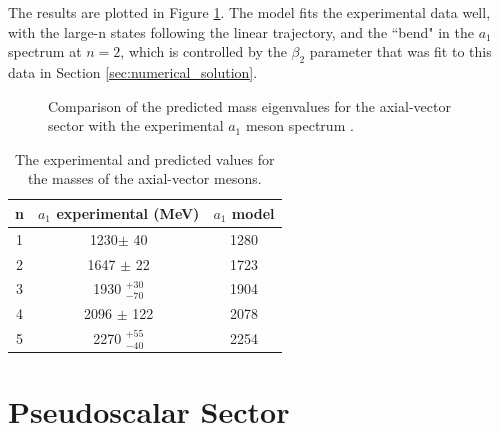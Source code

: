 The results are plotted in Figure \ref{fig:axial3}. 
The model fits the experimental data well, with the  large-n states following the linear trajectory, and the ``bend" in the $a_1$ spectrum at $n=2$, which is controlled by the $\beta_2$ parameter that was fit to this data in Section \ref{sec:numerical_solution}.


\begin{figure}[htb]
\caption{Comparison of the predicted mass eigenvalues for the axial-vector sector with the experimental $a_1$ meson spectrum \cite{PDG}.}
\label{fig:axial3}
\end{figure}




\begin{table}[htb]
\center
\begin{tabular}{| c || c | c  |}
\hline
n & $a_1$ experimental (MeV) & $a_1$ model \\
\hline
1 & 1230$\pm$ 40 &	    	1280	 \\
2 & 1647 $\pm$ 22 & 	1723	 \\
3 & 1930  $^{+30}_{-70}$ & 1904\\
4 & 2096 $\pm$ 122 &      2078	 \\ 
5 & 2270 $^{+55}_{-40}$  & 2254\\
\hline
\end{tabular}
\caption{The experimental \cite{PDG} and predicted values for the masses of the axial-vector mesons.}
\label{tabAxial}
\end{table}

\section{Pseudoscalar Sector}

